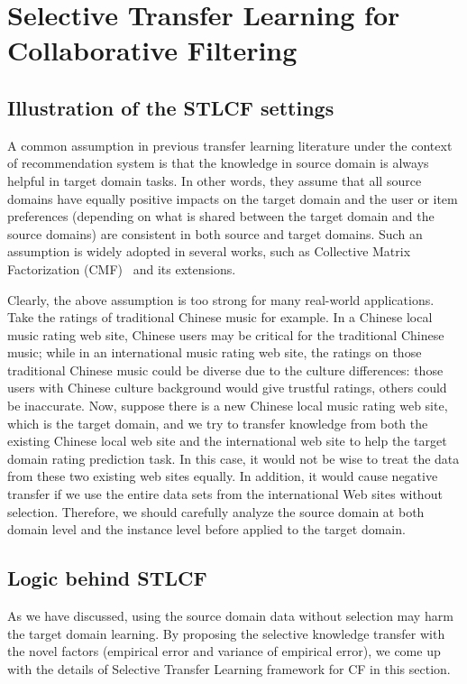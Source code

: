 \chapter{Selective Transfer Learning for Collaborative Filtering}
\label{chp:STLCF}

\hspace{0.1in}
\section{Illustration of the STLCF settings}
A common assumption in previous transfer learning literature under the context of recommendation system is that the knowledge in source domain is always helpful in target domain tasks. In other words, they assume that all source domains have equally positive impacts on the target domain and the user or item preferences (depending on what is shared between the target domain and the source domains) are consistent in both source and target domains.
Such an assumption is widely adopted in several works, such as Collective Matrix Factorization (CMF)~\cite{/kdd/SinghG08} and its extensions.

Clearly, the above assumption is too strong for many real-world applications.
Take the ratings of traditional Chinese music for example. In a Chinese local music rating web site, Chinese users may be critical for the traditional Chinese music; while in an international music rating web site, the ratings on those traditional Chinese music could be diverse due to the culture differences: those users with Chinese culture background would give trustful ratings, others could be inaccurate.
Now, suppose there is a new Chinese local music rating web site, which is the target domain, and we try to transfer knowledge from both the existing Chinese local web site and the international web site to help the target domain rating prediction task. In this case, it would not be wise to treat the data from these two existing web sites equally. In addition, it would cause negative transfer if we use the entire data sets from the international Web sites without selection.
Therefore, we should carefully analyze the source domain at both domain level and the instance level before applied to the target domain.


\hspace{0.1in}
\section{Logic behind STLCF}
As we have discussed, using the source domain data without selection may harm the target domain learning.
By proposing the selective knowledge transfer with the novel factors (empirical error and variance of empirical error), we come up with the details of Selective Transfer Learning framework for CF in this section.

